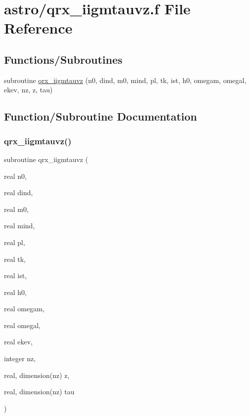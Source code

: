 \hypertarget{qrx__iigmtauvz_8f}{}\section{astro/qrx\+\_\+iigmtauvz.f File Reference}
\label{qrx__iigmtauvz_8f}
\subsection*{Functions/\+Subroutines}
\begin{DoxyCompactItemize}
\item 
subroutine \hyperlink{qrx__iigmtauvz_8f_a6ac61378005642018fabd58dea3a2291}{qrx\+\_\+iigmtauvz} (n0, dind, m0, mind, pl, tk, ist, h0, omegam, omegal, ekev, nz, z, tau)
\end{DoxyCompactItemize}


\subsection{Function/\+Subroutine Documentation}
\mbox{\label{qrx__iigmtauvz_8f_a6ac61378005642018fabd58dea3a2291}} 
\subsubsection{\texorpdfstring{qrx\+\_\+iigmtauvz()}{qrx\_iigmtauvz()}}
{\footnotesize\ttfamily subroutine qrx\+\_\+iigmtauvz (\begin{DoxyParamCaption}\item[{real}]{n0,  }\item[{real}]{dind,  }\item[{real}]{m0,  }\item[{real}]{mind,  }\item[{real}]{pl,  }\item[{real}]{tk,  }\item[{real}]{ist,  }\item[{real}]{h0,  }\item[{real}]{omegam,  }\item[{real}]{omegal,  }\item[{real}]{ekev,  }\item[{integer}]{nz,  }\item[{real, dimension(nz)}]{z,  }\item[{real, dimension(nz)}]{tau }\end{DoxyParamCaption})}

